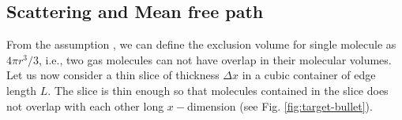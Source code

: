 \subsection{Scattering and Mean free path }
From the assumption , we can define the exclusion volume for single molecule as $ 4\pi r^3/3 $, i.e., two gas molecules can not have overlap in their molecular volumes. Let us now consider a thin slice of thickness $ \Delta x $ in a cubic container of edge length $ L $. The slice is thin enough so that molecules contained in the slice does not overlap with each other long $ x- $dimension (see Fig. \ref{fig:target-bullet}).
\begin{marginfigure}
	\begin{tikzpicture}[x=0.75pt,y=0.75pt,yscale=-0.9,xscale=0.9]
		

\end{tikzpicture}
\end{marginfigure}
